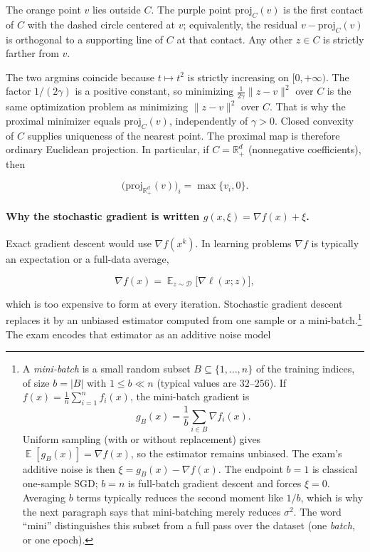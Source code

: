 \documentclass[11pt,a4paper]{article}
\DeclareMathOperator{\E}{\mathbb{E}}
\theoremstyle{definition}
\begin{document}
\begin{example}
\begin{center}
\end{center}

The orange point $v$ lies outside $C$. The purple point $\mathrm{proj}_C(v)$ is the first contact of $C$ with the dashed circle centered at $v$; equivalently, the residual $v-\mathrm{proj}_C(v)$ is orthogonal to a supporting line of $C$ at that contact. Any other $z\in C$ is strictly farther from $v$.

The two argmins coincide because $t\mapsto t^2$ is strictly increasing on $[0,+\infty)$. The factor $1/(2\gamma)$ is a positive constant, so minimizing $\frac{1}{2\gamma}\|z-v\|^2$ over $C$ is the same optimization problem as minimizing $\|z-v\|^2$ over $C$. That is why the proximal minimizer equals $\mathrm{proj}_C(v)$, independently of $\gamma>0$. Closed convexity of $C$ supplies uniqueness of the nearest point. The proximal map is therefore ordinary Euclidean projection. In particular, if $C=\mathbb{R}_+^d$ (nonnegative coefficients), then

\[
\bigl(\mathrm{proj}_{\mathbb{R}_+^d}(v)\bigr)_i
=\max\{v_i,0\}.
\]

\end{example}

\paragraph{Why the stochastic gradient is written $g(x,\xi)=\nabla f(x)+\xi$.}
Exact gradient descent would use $\nabla f(x^k)$. In learning problems $\nabla f$ is typically an expectation or a full-data average,

\[
\nabla f(x)=\E_{z\sim\mathcal{D}}\bigl[\nabla\ell(x;z)\bigr],
\]

which is too expensive to form at every iteration. Stochastic gradient descent replaces it by an unbiased estimator computed from one sample or a mini-batch.\footnote{A \emph{mini-batch} is a small random subset $B\subseteq\{1,\dots,n\}$ of the training indices, of size $b=|B|$ with $1\le b\ll n$ (typical values are $32$--$256$). If $f(x)=\frac1n\sum_{i=1}^n f_i(x)$, the mini-batch gradient is
\[
g_B(x)=\frac1b\sum_{i\in B}\nabla f_i(x).
\]
Uniform sampling (with or without replacement) gives $\E[g_B(x)]=\nabla f(x)$, so the estimator remains unbiased. The exam's additive noise is then $\xi=g_B(x)-\nabla f(x)$. The endpoint $b=1$ is classical one-sample SGD; $b=n$ is full-batch gradient descent and forces $\xi=0$. Averaging $b$ terms typically reduces the second moment like $1/b$, which is why the next paragraph says that mini-batching merely reduces $\sigma^2$. The word ``mini'' distinguishes this subset from a full pass over the dataset (one \emph{batch}, or one epoch).} The exam encodes that estimator as an additive noise model
\end{document}
